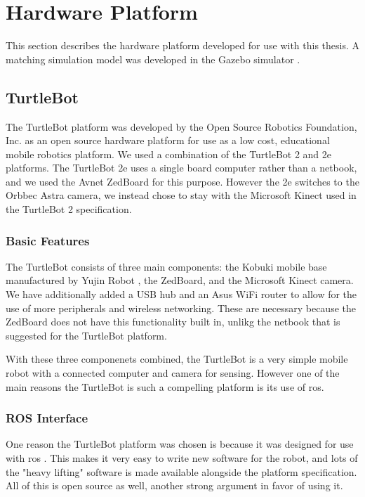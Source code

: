 \documentclass[thesis.tex]{subfile}
\begin{document}
\chapter{Hardware Platform} \label{Hardware Platform}
This section describes the hardware platform developed for use with this thesis. A matching simulation model was developed in the Gazebo simulator \cite{Koenig}.

\section{TurtleBot}
The TurtleBot platform \cite{TurtleBot} was developed by the Open Source Robotics Foundation, Inc. as an open source hardware platform for use as a low cost, educational mobile robotics platform. We used a combination of the TurtleBot 2 and 2e platforms. The TurtleBot 2e uses a single board computer rather than a netbook, and we used the Avnet ZedBoard \cite{ZedBoard} for this purpose. However the 2e switches to the Orbbec Astra camera, we instead chose to stay with the Microsoft Kinect used in the TurtleBot 2 specification.

\subsection{Basic Features}
The TurtleBot consists of three main components: the Kobuki mobile base manufactured by Yujin Robot \cite{Kobuki}, the ZedBoard, and the Microsoft Kinect camera. We have additionally added a USB hub and an Asus WiFi router to allow for the use of more peripherals and wireless networking. These are necessary because the ZedBoard does not have this functionality built in, unlikg the netbook that is suggested for the TurtleBot platform.

With these three componenets combined, the TurtleBot is a very simple mobile robot with a connected computer and camera for sensing. However one of the main reasons the TurtleBot is such a compelling platform is its use of \gls{ros}.

\subsection{ROS Interface}
One reason the TurtleBot platform was chosen is because it was designed for use with \gls{ros} \cite{TurtleBotWiki}. This makes it very easy to write new software for the robot, and lots of the "heavy lifting" software is made available alongside the platform specification. All of this is open source as well, another strong argument in favor of using it.
\end{document}

